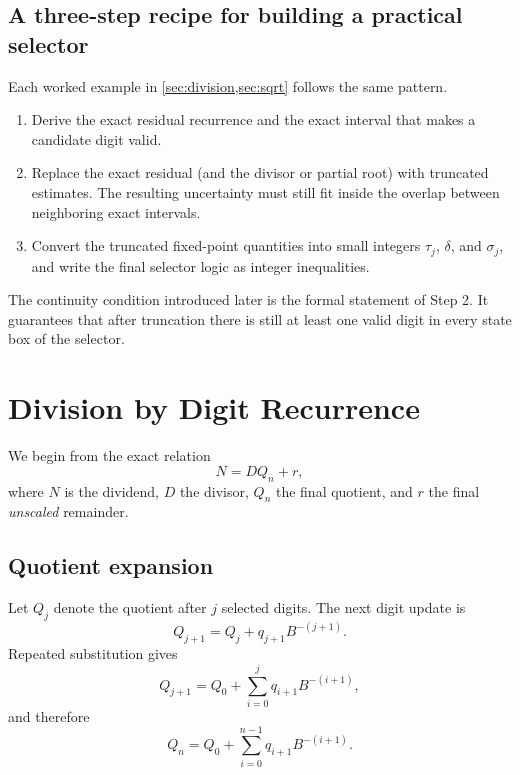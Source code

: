 \documentclass[11pt]{article}
\numberwithin{equation}{section}
\begin{document}
\subsection{A three-step recipe for building a practical selector}
\label{ssec:preliminaries:recipe}

Each worked example in \cref{sec:division,sec:sqrt} follows the same pattern.
\begin{enumerate}
  \item Derive the exact residual recurrence and the exact interval that makes a candidate digit
        valid.
  \item Replace the exact residual (and the divisor or partial root) with truncated estimates.
        The resulting uncertainty must still fit inside the overlap between neighboring exact
        intervals.
  \item Convert the truncated fixed-point quantities into small integers $\tau_j$, $\delta$, and
        $\sigma_j$, and write the final selector logic as integer inequalities.
\end{enumerate}
The continuity condition introduced later is the formal statement of Step 2.
It guarantees that after truncation there is still at least one valid digit in every state box of
the selector.

\clearpage

\section{Division by Digit Recurrence}
\label{sec:division}

We begin from the exact relation
\begin{equation}
  \label{eq:division:relation}
  N = DQ_n + r,
\end{equation}
where $N$ is the dividend, $D$ the divisor, $Q_n$ the final quotient, and $r$ the final
\emph{unscaled} remainder.

\subsection{Quotient expansion}
\label{ssec:division:quotient_expansion}

Let $Q_j$ denote the quotient after $j$ selected digits.
The next digit update is
\begin{equation}
  \label{eq:division:quotient_recurrence}
  Q_{j+1} = Q_j + q_{j+1}B^{-(j+1)}.
\end{equation}
Repeated substitution gives
\begin{equation}
  \label{eq:division:quotient_unfolded}
  Q_{j+1} = Q_0 + \sum_{i=0}^{j} q_{i+1}B^{-(i+1)},
\end{equation}
and therefore
\begin{equation}
  \label{eq:division:quotient_final}
  Q_n = Q_0 + \sum_{i=0}^{n-1} q_{i+1}B^{-(i+1)}.
\end{equation}
\end{document}
